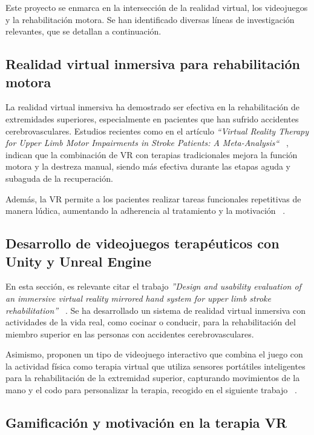 
Este proyecto se enmarca en la intersección de la realidad virtual, los videojuegos y la rehabilitación motora. Se han identificado diversas líneas de investigación relevantes, que se detallan a continuación.

\subsection{Realidad virtual inmersiva para rehabilitación motora}

La realidad virtual inmersiva ha demostrado ser efectiva en la rehabilitación de extremidades superiores, especialmente en pacientes que han sufrido accidentes cerebrovasculares. Estudios recientes como en el artículo \textit{``Virtual Reality Therapy for Upper Limb Motor Impairments in Stroke Patients: A Meta-Analysis`` }~\cite{vr_meta_stroke2024}, indican que la combinación de VR con terapias tradicionales mejora la función motora y la destreza manual, siendo más efectiva durante las etapas aguda y subaguda de la recuperación.

Además, la VR permite a los pacientes realizar tareas funcionales repetitivas de manera lúdica, aumentando la adherencia al tratamiento y la motivación ~\cite{vr_upper_extremity2023}.

\subsection{Desarrollo de videojuegos terapéuticos con Unity y Unreal Engine}

En esta sección, es relevante citar el trabajo \textit{''Design and usability evaluation of an immersive virtual reality mirrored hand system for upper limb stroke rehabilitation'' }~\cite{mirrored_hand_system2025}. Se ha desarrollado un sistema de realidad virtual inmersiva con actividades de la vida real, como cocinar o conducir, para la rehabilitación del miembro superior en las personas con accidentes cerebrovasculares.

Asimismo, proponen un tipo de videojuego interactivo que combina el juego con la actividad física como terapia virtual que utiliza sensores portátiles inteligentes para la rehabilitación de la extremidad superior, capturando movimientos de la mano y el codo para personalizar la terapia, recogido en el siguiente trabajo ~\cite{exergame_sensors2023}.

\subsection{Gamificación y motivación en la terapia VR}

